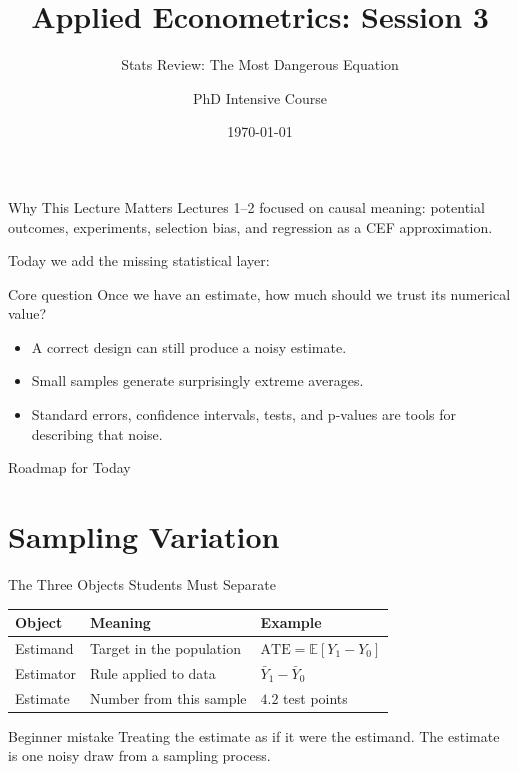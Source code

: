 \documentclass[11pt,aspectratio=169]{beamer}
\title{Applied Econometrics: Session 3}
\subtitle{Stats Review: The Most Dangerous Equation}
\author{PhD Intensive Course}
\institute{Lecture 3}
\date{\today}
\newcommand{\E}{\mathbb{E}}
\newcommand{\ATE}{\mathrm{ATE}}
\begin{document}
\begin{frame}
  \titlepage
\end{frame}

\begin{frame}{Why This Lecture Matters}
  Lectures 1--2 focused on causal meaning: potential outcomes, experiments, selection bias, and regression as a CEF approximation.
  \vspace{0.4em}

  Today we add the missing statistical layer:
  \begin{block}{Core question}
    Once we have an estimate, how much should we trust its numerical value?
  \end{block}

  \begin{itemize}
    \item A correct design can still produce a noisy estimate.
    \item Small samples generate surprisingly extreme averages.
    \item Standard errors, confidence intervals, tests, and p-values are tools for describing that noise.
  \end{itemize}
\end{frame}

\begin{frame}{Roadmap for Today}
  \tableofcontents
\end{frame}

\section{Sampling Variation}

\begin{frame}{The Three Objects Students Must Separate}
  \begin{center}
  \begin{tabular}{lll}
    \toprule
    Object & Meaning & Example \\
    \midrule
    Estimand & Target in the population & \(\ATE=\E[Y_1-Y_0]\) \\
    Estimator & Rule applied to data & \(\bar{Y}_1-\bar{Y}_0\) \\
    Estimate & Number from this sample & \(4.2\) test points \\
    \bottomrule
  \end{tabular}
  \end{center}
  \vspace{0.6em}
  \begin{block}{Beginner mistake}
    Treating the estimate as if it were the estimand. The estimate is one noisy draw from a sampling process.
  \end{block}
\end{frame}
\end{document}
